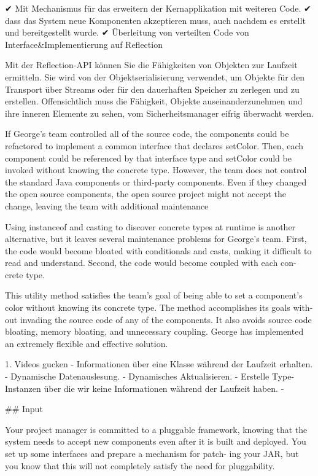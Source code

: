 \begin{itemize}

 ✔ Mit Mechanismus für das erweitern der Kernapplikation mit weiteren Code. 
 ✔ dass das System neue Komponenten akzeptieren muss, auch nachdem es erstellt und bereitgestellt wurde.
 ✔ Überleitung von verteilten Code von Interface&Implementierung auf Reflection


Mit der Reflection-API können Sie die Fähigkeiten von Objekten zur Laufzeit ermitteln. Sie wird von der Objektserialisierung verwendet, um Objekte für den Transport über Streams oder für den dauerhaften Speicher zu zerlegen und zu erstellen. Offensichtlich muss die Fähigkeit, Objekte auseinanderzunehmen und ihre inneren Elemente zu sehen, vom Sicherheitsmanager eifrig überwacht werden.


 If George’s team controlled all of the source code, the components could be refactored to implement a common interface that declares setColor. Then, each component could be referenced by that interface type and setColor could be invoked without knowing the concrete type. However, the team does not control the standard Java components or third-party components. Even if they changed the open source components, the open source project might not accept the change, leaving the team with additional maintenance

 Using instanceof and casting to discover concrete types at runtime is another alternative, but it leaves several maintenance problems for George’s team. First, the code would become bloated with conditionals and casts, making it difficult to read and understand. Second, the code would become coupled with each con- crete type. 

 This utility method satisfies the team’s goal of being able to set a component’s color without knowing its concrete type. The method accomplishes its goals with- out invading the source code of any of the components. It also avoids source code bloating, memory bloating, and unnecessary coupling. George has implemented an extremely flexible and effective solution.

 1. Videos gucken
  - Informationen über eine Klasse während der Laufzeit erhalten.
  - Dynamische Datenauslesung.
  - Dynamisches Aktualisieren.
  - Erstelle Type-Instanzen über die wir  keine Informationen während der Laufzeit haben.  
  -



## Input 

Your project manager is committed to a pluggable framework, knowing that the system needs to accept new components even after it is built and deployed. You set up some interfaces and prepare a mechanism for patch- ing your JAR, but you know that this will not completely satisfy the need for pluggability.


\end{itemize}
